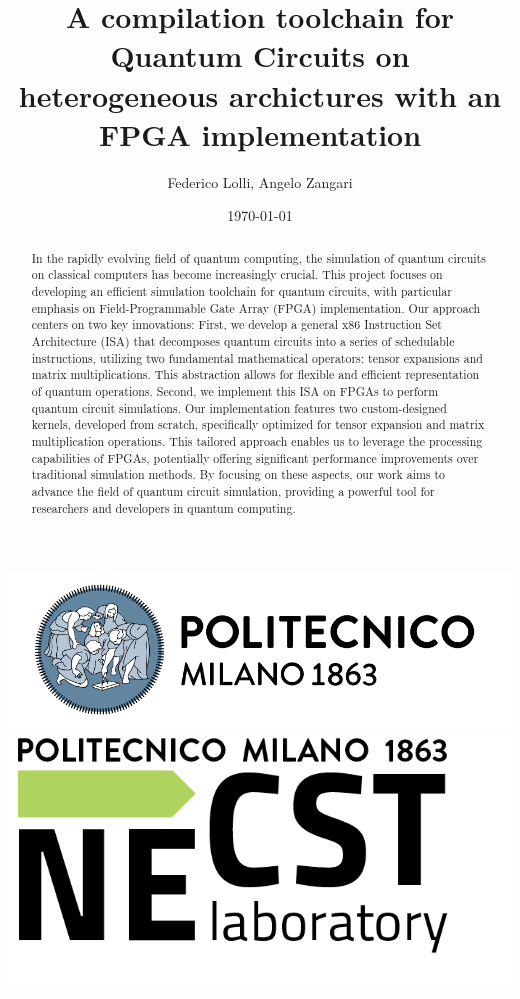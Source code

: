 \documentclass[12pt,oneside,a4paper]{article}
\title{\textbf{A compilation toolchain for Quantum Circuits on heterogeneous archictures with an FPGA implementation}}
\author{Federico Lolli, Angelo Zangari}
\date{\today}
\begin{document}
\begin{titlepage}
    \centering
    \clearpage
    \maketitle
	\thispagestyle{empty}
	\vspace*{1cm}
	\vfill
	\centering
	\includegraphics{logo_polimi.png}\includegraphics{logo_NECST.png}
\end{titlepage}


\begin{abstract}
	
	In the rapidly evolving field of quantum computing, the simulation of quantum circuits on classical computers has become increasingly crucial. This project focuses on developing an efficient simulation toolchain for quantum circuits, with particular emphasis on Field-Programmable Gate Array (FPGA) implementation. Our approach centers on two key innovations: First, we develop a general x86 Instruction Set Architecture (ISA) that decomposes quantum circuits into a series of schedulable instructions, utilizing two fundamental mathematical operators: tensor expansions and matrix multiplications. This abstraction allows for flexible and efficient representation of quantum operations. Second, we implement this ISA on FPGAs to perform quantum circuit simulations. Our implementation features two custom-designed kernels, developed from scratch, specifically optimized for tensor expansion and matrix multiplication operations. This tailored approach enables us to leverage the  processing capabilities of FPGAs, potentially offering significant performance improvements over traditional simulation methods. By focusing on these aspects, our work aims to advance the field of quantum circuit simulation, providing a powerful tool for researchers and developers in quantum computing.
	
\end{abstract} 
\end{document}
